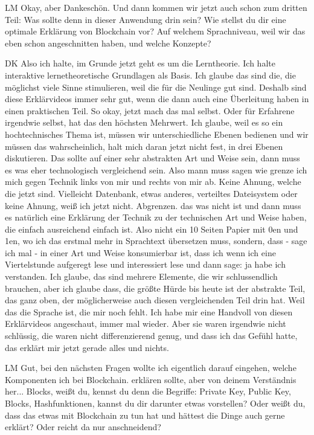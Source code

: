 \begin{xlist}
     \item[LM] Okay, aber Dankeschön. Und dann kommen wir jetzt auch schon zum dritten Teil: Was sollte denn in dieser Anwendung drin sein? Wie stellst du dir eine optimale Erklärung von Blockchain vor? Auf welchem Sprachniveau, weil wir das eben schon angeschnitten haben, und welche Konzepte?
     \item[DK] Also ich halte, im Grunde jetzt geht es um die Lerntheorie. Ich halte interaktive lernetheoretische Grundlagen als Basis. Ich glaube das sind die, die möglichst viele Sinne stimulieren, weil die für die Neulinge gut sind. Deshalb sind diese Erklärvideos immer sehr gut, wenn die dann auch eine Überleitung haben in einen praktischen Teil. So okay, jetzt mach das mal selbst. Oder für Erfahrene irgendwie selbst, hat das den höchsten Mehrwert. Ich glaube, weil es so ein hochtechnisches Thema ist, müssen wir unterschiedliche Ebenen bedienen und wir müssen das wahrscheinlich, halt mich daran jetzt nicht fest, in drei Ebenen diskutieren. Das sollte auf einer sehr abstrakten Art und Weise sein, dann muss es was eher technologisch vergleichend sein. Also mann muss sagen wie grenze ich mich gegen Technik links von mir und rechts von mir ab.  Keine Ahnung, welche die jetzt sind. Vielleicht Datenbank, etwas anderes,  verteiltes Dateisystem oder keine Ahnung, weiß ich jetzt nicht. Abgrenzen. das was nicht ist und dann muss es natürlich eine Erklärung der Technik zu der technischen Art und Weise haben, die einfach ausreichend einfach ist. Also nicht ein 10 Seiten Papier mit 0en und 1en, wo ich das erstmal mehr in Sprachtext übersetzen muss, sondern, dass - sage ich mal - in einer Art und Weise konsumierbar ist, dass ich wenn ich eine Viertelstunde aufgeregt lese und interessiert lese und dann sage: ja habe ich verstanden. Ich glaube, das sind mehrere Elemente, die wir schlussendlich brauchen, aber ich glaube dass, die größte Hürde bis heute ist der abstrakte Teil, das ganz oben, der möglicherweise auch diesen vergleichenden Teil drin hat. Weil das die Sprache ist, die mir noch fehlt. Ich habe mir eine Handvoll von diesen Erklärvideos angeschaut, immer mal wieder. Aber sie waren irgendwie nicht schlüssig, die waren nicht differenzierend genug,  und dass ich das Gefühl hatte, das erklärt mir jetzt gerade alles und nichts. 
     \item[LM] Gut, bei den nächsten Fragen wollte ich eigentlich darauf eingehen, welche Komponenten ich bei Blockchain. erklären sollte, aber von deinem Verständnis her... Blocks, weißt du, kennst du denn die Begriffe: Private Key, Public Key, Blocks, Hashfunktionen, kannst du dir darunter etwas vorstellen? Oder weißt du, dass das etwas mit Blockchain zu tun hat und hättest die Dinge auch gerne erklärt? Oder reicht da nur anschneidend?

\end{xlist}
